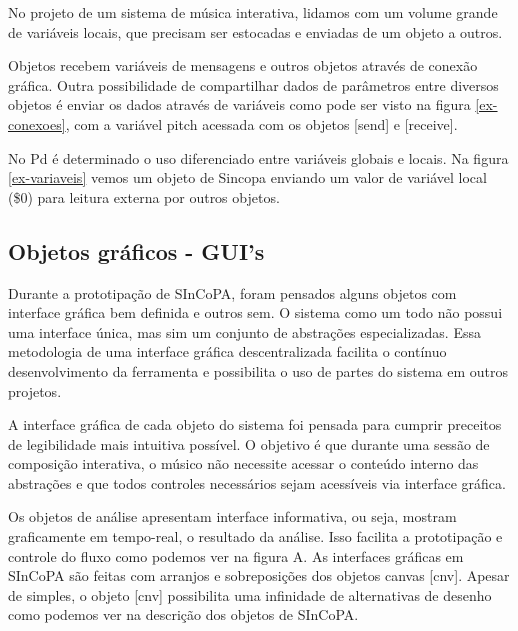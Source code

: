 \documentclass{ppgmus}
\begin{document}
No projeto de um sistema de música interativa, lidamos com um volume grande
de variáveis locais, que precisam ser estocadas e enviadas de um objeto a outros.

Objetos recebem variáveis de mensagens e outros objetos através de conexão
gráfica. Outra possibilidade de compartilhar dados de parâmetros entre diversos
objetos é enviar os dados através de variáveis como pode ser visto na figura \ref{ex-conexoes},
com a variável pitch acessada com os objetos [send] e [receive].

No Pd é determinado o uso diferenciado entre variáveis globais e locais.
Na figura \ref{ex-variaveis} vemos um objeto de Sincopa enviando um valor de 
variável local (\$0) para leitura externa por outros objetos.



\subsection{Objetos gráficos - GUI's}


Durante a prototipação de SInCoPA, foram pensados
alguns objetos com interface gráfica bem definida e outros
sem. O sistema como um todo não possui uma interface única, mas
sim um conjunto de abstrações especializadas. Essa metodologia
de uma interface gráfica descentralizada facilita o contínuo
desenvolvimento da ferramenta e possibilita o uso de partes do
sistema em outros projetos.

A interface gráfica de cada objeto do sistema foi pensada para cumprir
preceitos de legibilidade mais intuitiva possível. O
objetivo é que durante uma sessão de composição interativa, o
músico não necessite acessar o conteúdo interno das abstrações e 
que todos controles necessários sejam acessíveis via interface gráfica. 

Os objetos de análise apresentam interface informativa, ou seja, 
mostram graficamente em tempo-real, o resultado da análise. Isso facilita
a prototipação e controle do fluxo como podemos ver  na figura A.
As interfaces gráficas em SInCoPA são feitas com arranjos e sobreposições
dos objetos canvas [cnv]. Apesar de simples, o objeto [cnv] possibilita
uma infinidade de alternativas de desenho como podemos ver na descrição
dos objetos de SInCoPA.
\end{document}
